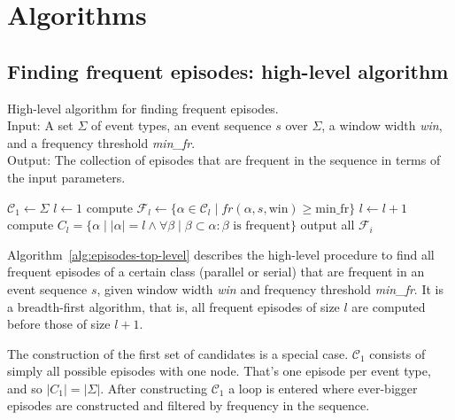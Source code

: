 \section{Algorithms}

\subsection{Finding frequent episodes: high-level algorithm}

\begin{algorithm}

\caption{High-level algorithm for finding frequent episodes. \\
Input: A set $ \Sigma $ of event types, an event sequence $ s $ over $ \Sigma $, a window width \emph{win}, and a frequency threshold \emph{min\_fr}. \\
Output: The collection of episodes that are frequent in the sequence in terms of the input parameters.
}

\begin{algorithmic}[1]

\State $ \mathcal{C}_1 \gets \Sigma $
\State $ l \gets 1 $
    \State compute $ \mathcal{F}_l \gets \{ \alpha \in \mathcal{C}_l \mid fr(\alpha, s, \text{win}) \geq \text{min\_fr} \} $
    \State $ l \gets l + 1 $
    \State compute $ C_l = \{ \alpha \mid | \alpha | = l \wedge \forall \beta \mid \beta \subset \alpha : \beta \text{ is frequent} \} $
\EndWhile
\State output all $ \mathcal{F}_i $

\end{algorithmic}

\label{alg:episodes-top-level}
\end{algorithm}


Algorithm~\ref{alg:episodes-top-level} describes the high-level procedure to find all frequent episodes of a certain class (parallel or serial) that are frequent in an event sequence $ s $, given window width \emph{win} and frequency threshold \emph{min\_fr}. It is a breadth-first algorithm, that is, all frequent episodes of size $ l $ are computed before those of size $ l + 1 $.

The construction of the first set of candidates is a special case. $ \mathcal{C}_1 $ consists of simply all possible episodes with one node. That's one episode per event type, and so $ | C_1 | = | \Sigma | $. After constructing $ \mathcal{C}_1 $ a loop is entered where
ever-bigger episodes are constructed and filtered by frequency in the sequence.

